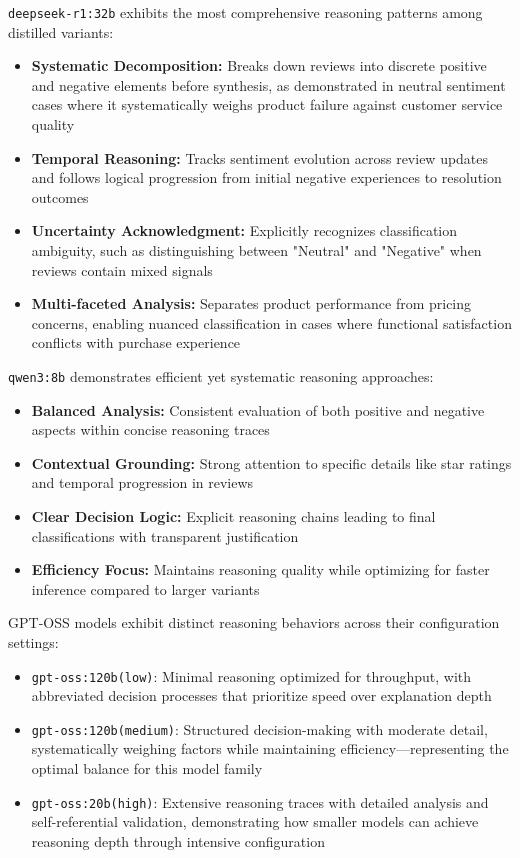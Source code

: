 \documentclass[conference]{IEEEtran}
\newcommand{\deepseekr}[1]{\texttt{deepseek-r1:#1}}
\newcommand{\qwenthree}[1]{\texttt{qwen3:#1}}
\newcommand{\gptoss}[2]{\texttt{gpt-oss:#1(#2)}}
\newcommand{\GPToss}{GPT-OSS}
\begin{document}
\deepseekr{32b} exhibits the most comprehensive reasoning patterns among distilled variants:
\begin{itemize}[leftmargin=*,nosep]
\item \textbf{Systematic Decomposition:} Breaks down reviews into discrete positive and negative elements before synthesis, as demonstrated in neutral sentiment cases where it systematically weighs product failure against customer service quality
\item \textbf{Temporal Reasoning:} Tracks sentiment evolution across review updates and follows logical progression from initial negative experiences to resolution outcomes
\item \textbf{Uncertainty Acknowledgment:} Explicitly recognizes classification ambiguity, such as distinguishing between "Neutral" and "Negative" when reviews contain mixed signals
\item \textbf{Multi-faceted Analysis:} Separates product performance from pricing concerns, enabling nuanced classification in cases where functional satisfaction conflicts with purchase experience
\end{itemize}

\qwenthree{8b} demonstrates efficient yet systematic reasoning approaches:
\begin{itemize}[leftmargin=*,nosep]
\item \textbf{Balanced Analysis:} Consistent evaluation of both positive and negative aspects within concise reasoning traces
\item \textbf{Contextual Grounding:} Strong attention to specific details like star ratings and temporal progression in reviews
\item \textbf{Clear Decision Logic:} Explicit reasoning chains leading to final classifications with transparent justification
\item \textbf{Efficiency Focus:} Maintains reasoning quality while optimizing for faster inference compared to larger variants
\end{itemize}

\GPToss{} models exhibit distinct reasoning behaviors across their configuration settings:
\begin{itemize}[leftmargin=*,nosep]
\item \gptoss{120b}{low}: Minimal reasoning optimized for throughput, with abbreviated decision processes that prioritize speed over explanation depth
\item \gptoss{120b}{medium}: Structured decision-making with moderate detail, systematically weighing factors while maintaining efficiency—representing the optimal balance for this model family
\item \gptoss{20b}{high}: Extensive reasoning traces with detailed analysis and self-referential validation, demonstrating how smaller models can achieve reasoning depth through intensive configuration
\end{itemize}
\end{document}
